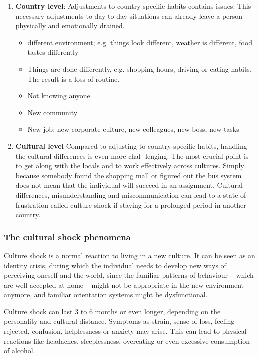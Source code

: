 \begin{enumerate}
	\item \textbf{Country level}: Adjustments to country specific habits contains issues. This necessary adjustments to day-to-day situations can already leave a person physically and emotionally drained.
	\begin{itemize}
		\tightlist
		\item different environment; e.g. things look different, weather is different, food tastes differently
		\item Things are done differently, e.g. shopping hours, driving or eating habits. The result is a loss of routine.
		\item Not knowing anyone
		\item New community
		\item New job: new corporate culture, new colleagues, new boss, new tasks
	\end{itemize}
	\item \textbf{Cultural level} Compared to adjusting to country specific habits, handling the cultural differences is even more chal-
	lenging. The most crucial point is to get along with the locals and to work effectively across cultures.
	Simply because somebody found the shopping mall or figured out the bus system does not mean that the individual will succeed in an assignment. Cultural differences, misunderstanding and miscommunication can lead to a state of frustration called culture shock if staying for a prolonged period in another country.
\end{enumerate}

\subsubsection{The cultural shock phenomena}
Culture shock is a normal reaction to living in a new culture. It can be seen as an identity crisis, during which the individual needs to develop new ways of perceiving oneself and the world, since the familiar patterns of behaviour – which are well accepted at home – might not be appropriate in the new environment anymore, and familiar orientation systems might be dysfunctional.

Culture shock can last 3 to 6 months or even longer, depending on the personality and cultural distance. Symptoms as strain, sense of loss, feeling rejected, confusion, helplessness or anxiety may arise. This can lead to physical reactions like headaches, sleeplessness, overeating or even excessive consumption of alcohol.

